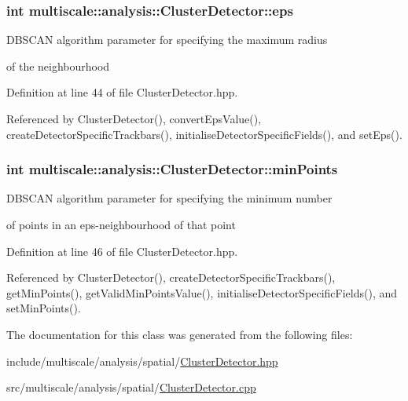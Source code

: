 \hypertarget{classmultiscale_1_1analysis_1_1ClusterDetector_a61e876f87d62245eada8f56d587d39cd}{
\subsubsection[{eps}]{\setlength{\rightskip}{0pt plus 5cm}int multiscale\-::analysis\-::\-Cluster\-Detector\-::eps\hspace{0.3cm}{\ttfamily [protected]}}}\label{classmultiscale_1_1analysis_1_1ClusterDetector_a61e876f87d62245eada8f56d587d39cd}
\begin{DoxyVerb}                        DBSCAN algorithm parameter for specifying the maximum radius
\end{DoxyVerb}
 of the neighbourhood 

Definition at line 44 of file Cluster\-Detector.\-hpp.



Referenced by Cluster\-Detector(), convert\-Eps\-Value(), create\-Detector\-Specific\-Trackbars(), initialise\-Detector\-Specific\-Fields(), and set\-Eps().

\hypertarget{classmultiscale_1_1analysis_1_1ClusterDetector_aa94df1adc462be5931ec25ba24122fe9}{
\subsubsection[{min\-Points}]{\setlength{\rightskip}{0pt plus 5cm}int multiscale\-::analysis\-::\-Cluster\-Detector\-::min\-Points\hspace{0.3cm}{\ttfamily [protected]}}}\label{classmultiscale_1_1analysis_1_1ClusterDetector_aa94df1adc462be5931ec25ba24122fe9}
\begin{DoxyVerb}                  DBSCAN algorithm parameter for specifying the minimum number
\end{DoxyVerb}
 of points in an eps-\/neighbourhood of that point 

Definition at line 46 of file Cluster\-Detector.\-hpp.



Referenced by Cluster\-Detector(), create\-Detector\-Specific\-Trackbars(), get\-Min\-Points(), get\-Valid\-Min\-Points\-Value(), initialise\-Detector\-Specific\-Fields(), and set\-Min\-Points().



The documentation for this class was generated from the following files\-:\begin{DoxyCompactItemize}
\item 
include/multiscale/analysis/spatial/\hyperlink{ClusterDetector_8hpp}{Cluster\-Detector.\-hpp}\item 
src/multiscale/analysis/spatial/\hyperlink{ClusterDetector_8cpp}{Cluster\-Detector.\-cpp}\end{DoxyCompactItemize}
